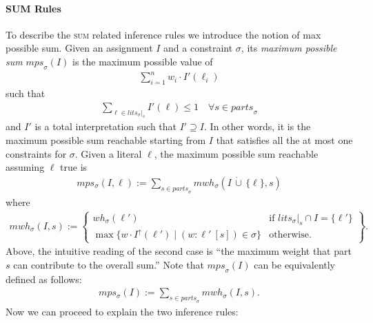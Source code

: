 \documentclass[preprint,authoryear]{elsarticle}
\newcommand{\lits}{\mathit{lits}}
\newcommand{\wh}{\mathit{wh}}
\newcommand{\mps}{\mathit{mps}}
\newcommand{\parts}{\mathit{parts}}
\newcommand{\cupdot}{\,\dot{\cup}\,}
\theoremstyle{definition}
\begin{document}
\paragraph{SUM Rules}
To describe the \textsc{sum} related inference rules we introduce the notion of max possible sum.
Given an assignment $I$ and a constraint $\sigma$, its \emph{maximum possible sum} $\mathit{mps}_\sigma(I)$
is the maximum possible value of 
\begin{align*}
    \sum_{i = 1}^{n}{w_i \cdot I'(\ell_i)}
\end{align*} 
such that 
\begin{align*}
    \sum_{\ell \in \mathit{lits}_\sigma|_s}{I'(\ell)} \leq 1 \quad \forall  s \in \mathit{parts}_{\sigma} 
\end{align*}
and $I'$ is a total interpretation such that $I' \supseteq I$. 
In other words, it is the maximum possible sum reachable starting from $I$ that satisfies all the at most one constraints for $\sigma$.
Given a literal $\ell$, the maximum possible sum reachable assuming $\ell$ true is
\begin{align}
    \label{eq:mps}
    mps_\sigma(I, \ell) := \sum_{s \in \parts_\sigma} \mathit{mwh}_\sigma(I \cupdot \{ \ell \},s)
\end{align}
where 
\begin{align*}
    \mathit{mwh}_\sigma(I,s) := \left\{
        \begin{array}{ll}
            \wh_\sigma(\ell') & \text{if } \lits_\sigma|_s \cap I = \{\ell'\} \\
            \max\{w \cdot I^\uparrow(\ell') \mid (w : \ell'\ [s]) \in \sigma\} & \text{otherwise.}
        \end{array}
    \right\}.
\end{align*}
Above, the intuitive reading of the second case is ``the maximum weight that part $s$ can contribute to the overall sum.''
Note that $\mps_\sigma(I)$ can be equivalently defined as follows:
\begin{align}
    \label{eq:mps2}
    mps_\sigma(I) := \sum_{s \in \parts_\sigma} \mathit{mwh}_\sigma(I,s).
\end{align}
Now we can proceed to explain the two inference rules:
\end{document}
